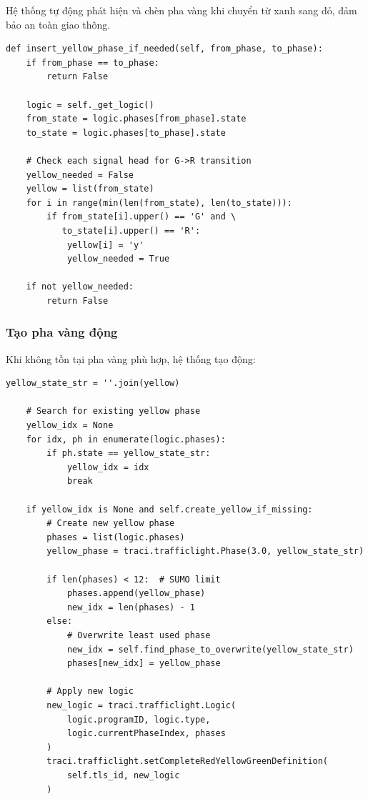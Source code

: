 Hệ thống tự động phát hiện và chèn pha vàng khi chuyển từ xanh sang đỏ, đảm bảo an toàn giao thông.

\begin{lstlisting}[style=py, caption={Thuật toán xác định khi nào cần pha vàng:}]
def insert_yellow_phase_if_needed(self, from_phase, to_phase):
    if from_phase == to_phase:
        return False
        
    logic = self._get_logic()
    from_state = logic.phases[from_phase].state
    to_state = logic.phases[to_phase].state
    
    # Check each signal head for G->R transition
    yellow_needed = False
    yellow = list(from_state)
    for i in range(min(len(from_state), len(to_state))):
        if from_state[i].upper() == 'G' and \
           to_state[i].upper() == 'R':
            yellow[i] = 'y'
            yellow_needed = True
    
    if not yellow_needed:
        return False
\end{lstlisting}

\subsubsection{Tạo pha vàng động}

Khi không tồn tại pha vàng phù hợp, hệ thống tạo động:

\begin{lstlisting}[style=py, caption={Dynamic yellow phase creation}]
    yellow_state_str = ''.join(yellow)
    
    # Search for existing yellow phase
    yellow_idx = None
    for idx, ph in enumerate(logic.phases):
        if ph.state == yellow_state_str:
            yellow_idx = idx
            break
    
    if yellow_idx is None and self.create_yellow_if_missing:
        # Create new yellow phase
        phases = list(logic.phases)
        yellow_phase = traci.trafficlight.Phase(3.0, yellow_state_str)
        
        if len(phases) < 12:  # SUMO limit
            phases.append(yellow_phase)
            new_idx = len(phases) - 1
        else:
            # Overwrite least used phase
            new_idx = self.find_phase_to_overwrite(yellow_state_str)
            phases[new_idx] = yellow_phase
            
        # Apply new logic
        new_logic = traci.trafficlight.Logic(
            logic.programID, logic.type, 
            logic.currentPhaseIndex, phases
        )
        traci.trafficlight.setCompleteRedYellowGreenDefinition(
            self.tls_id, new_logic
        )
\end{lstlisting}

